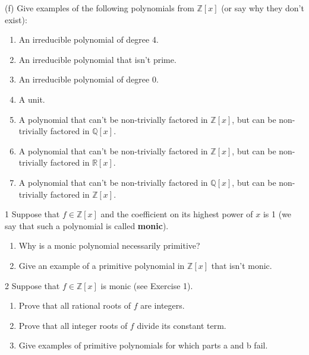\begin{problem}[Warmup]{(f)}
    Give examples of the following polynomials from $\mathbb{Z}[x]$ (or say why they don't exist):
    \begin{enumerate}
        \item[(a)] An irreducible polynomial of degree 4.
        \item[(b)] An irreducible polynomial that isn't prime.
        \item[(c)] An irreducible polynomial of degree 0.
        \item[(d)] A unit.
        \item[(e)] A polynomial that can't be non-trivially factored in $\mathbb{Z}[x]$, but can be non-trivially factored in $\mathbb{Q}[x]$.
        \item[(f)] A polynomial that can't be non-trivially factored in $\mathbb{Z}[x]$, but can be non-trivially factored in $\mathbb{R}[x]$.
        \item[(g)] A polynomial that can't be non-trivially factored in $\mathbb{Q}[x]$, but can be non-trivially factored in $\mathbb{Z}[x]$.
    \end{enumerate}
\end{problem}
\unsolved

\begin{problem}{1}
    Suppose that $f \in \mathbb{Z}[x]$ and the coefficient on its highest power of $x$ is
    1 (we say that such a polynomial is called \textbf{monic}).
    \begin{enumerate}
        \item[(a)] Why is a monic polynomial necessarily primitive?
        \item[(b)] Give an example of a primitive polynomial in $\mathbb{Z}[x]$ that isn't
        monic.
    \end{enumerate}
\end{problem}
\unsolved

\begin{problem}{2}
    Suppose that $f \in \mathbb{Z}[x]$ is monic (see Exercise 1).
    \begin{enumerate}
        \item[(a)] Prove that all rational roots of $f$ are integers.
        \item[(b)] Prove that all integer roots of $f$ divide its constant term.
        \item[(c)] Give examples of primitive polynomials for which parts a and b fail.
    \end{enumerate}
\end{problem}
\unsolved

